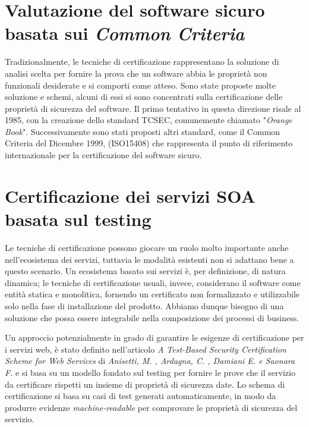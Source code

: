 \section{Valutazione del software sicuro basata sui \textit{Common Criteria}}
Tradizionalmente, le tecniche di certificazione rappresentano la soluzione di analisi scelta per fornire la prova che un software abbia le proprietà non funzionali desiderate e si comporti come atteso.
Sono state proposte molte soluzione e schemi, alcuni di essi si sono concentrati sulla certificazione delle proprietà di sicurezza del software.\cite{CitCertSoa}
Il primo tentativo in questa direzione risale al 1985, con la creazione dello standard TCSEC, comunemente chiamato "\textit{Orange Book}"\cite{OrangeBook}.
Successivamente sono stati proposti altri standard, come il Common Criteria del Dicembre 1999, (ISO15408) che rappresenta il punto di riferimento internazionale per la certificazione del software sicuro.\cite{HerrmannCC}






\section{Certificazione dei servizi SOA basata sul testing}
Le tecniche di certificazione possono giocare un ruolo molto importante anche nell'ecosistema dei servizi, tuttavia le modalità esistenti non si adattano bene a questo scenario. Un ecosistema basato sui servizi è, per definizione, di natura dinamica; le tecniche di certificazione usuali, invece, considerano il software come entità statica e monolitica, fornendo un certificato non formalizzato e utilizzabile solo nella fase di installazione del prodotto.
Abbiamo dunque bisogno di una soluzione che possa essere integrabile nella composizione dei processi di business.\cite{DamianiCitCertSoa} 
\cite{CitCertSoa}

Un approccio potenzialmente in grado di garantire le esigenze di certificazione per i servizi web, è stato definito nell'articolo \textit{A Test-Based Security Certification Scheme for Web Services} di \textit{Anisetti, M. , Ardagna, C. , Damiani E. e Saonara F.}\cite{CitCertSoa} e si basa su un modello fondato sul testing per fornire le prove che il servizio da certificare rispetti un insieme di proprietà di sicurezza date.
Lo schema di certificazione si basa su casi di test generati automaticamente, in modo da produrre evidenze \textit{machine-readable} per comprovare le proprietà di sicurezza del servizio.\cite{CitCertSoa}

